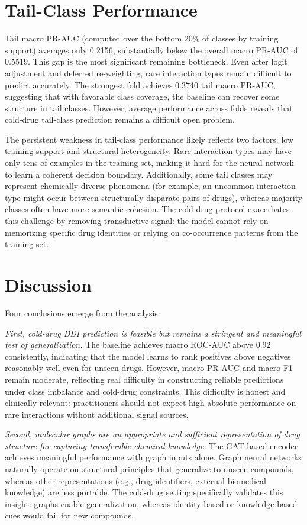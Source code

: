\documentclass[11pt,a4paper]{report}
\begin{document}
\section{Tail-Class Performance}
Tail macro PR-AUC (computed over the bottom 20\% of classes by training support) averages only 0.2156, substantially below the overall macro PR-AUC of 0.5519. This gap is the most significant remaining bottleneck. Even after logit adjustment and deferred re-weighting, rare interaction types remain difficult to predict accurately. The strongest fold achieves 0.3740 tail macro PR-AUC, suggesting that with favorable class coverage, the baseline can recover some structure in tail classes. However, average performance across folds reveals that cold-drug tail-class prediction remains a difficult open problem.

The persistent weakness in tail-class performance likely reflects two factors: low training support and structural heterogeneity. Rare interaction types may have only tens of examples in the training set, making it hard for the neural network to learn a coherent decision boundary. Additionally, some tail classes may represent chemically diverse phenomena (for example, an uncommon interaction type might occur between structurally disparate pairs of drugs), whereas majority classes often have more semantic cohesion. The cold-drug protocol exacerbates this challenge by removing transductive signal: the model cannot rely on memorizing specific drug identities or relying on co-occurrence patterns from the training set.

\section{Discussion}
Four conclusions emerge from the analysis.

\textit{First, cold-drug DDI prediction is feasible but remains a stringent and meaningful test of generalization.} The baseline achieves macro ROC-AUC above 0.92 consistently, indicating that the model learns to rank positives above negatives reasonably well even for unseen drugs. However, macro PR-AUC and macro-F1 remain moderate, reflecting real difficulty in constructing reliable predictions under class imbalance and cold-drug constraints. This difficulty is honest and clinically relevant: practitioners should not expect high absolute performance on rare interactions without additional signal sources.

\textit{Second, molecular graphs are an appropriate and sufficient representation of drug structure for capturing transferable chemical knowledge.} The GAT-based encoder achieves meaningful performance with graph inputs alone. Graph neural networks naturally operate on structural principles that generalize to unseen compounds, whereas other representations (e.g., drug identifiers, external biomedical knowledge) are less portable. The cold-drug setting specifically validates this insight: graphs enable generalization, whereas identity-based or knowledge-based cues would fail for new compounds.
\end{document}
